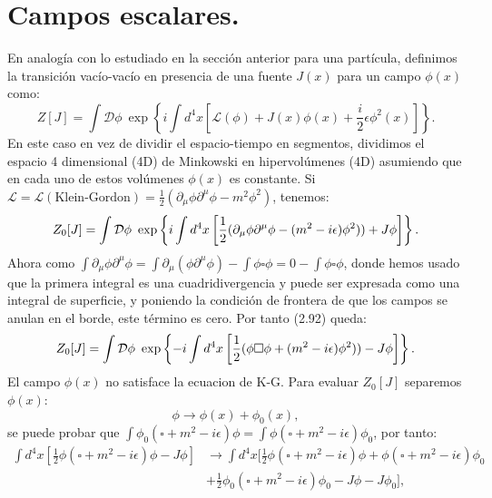 \section{Campos escalares.}
En analogía con lo estudiado en la sección anterior para una partícula, definimos la transición vacío-vacío en presencia de una fuente $J(x)$ para un campo $\phi(x)$ como:
\begin{equation}
Z[J]=\int\mathcal{D}\phi\ \exp\left\{ i\int d^{4}x\left[\mathcal{L}(\phi)+J(x)\phi(x)+\frac{i}{2}\epsilon\phi^{2}(x)\right]\right\} .
\end{equation}
En este caso en vez de dividir el espacio-tiempo en segmentos, dividimos el espacio 4 dimensional (4D) de Minkowski en hipervolúmenes (4D) asumiendo que en cada uno de estos volúmenes $\phi(x)$ es constante. Si $\mathcal{L}=\mathcal{L}(\text{Klein-Gordon})=\frac{1}{2}(\partial_\mu\phi\partial^\mu\phi-m^2 \phi^2)$, tenemos:
\begin{equation}
Z_{0}[J]=\text{\ensuremath{\int\mathcal{D}}}\phi\ \exp\left\{ i\int d^{4}x\left[\frac{1}{2}(\partial_{\mu}\phi\partial^{\mu}\phi-(m^{2}-i\epsilon)\phi^{2}))+J\phi\right]\right\} .
\end{equation} 	
Ahora como $\int\partial_{\mu}\phi\partial^{\mu}\phi=\int\partial_{\mu}(\phi\partial^{\mu}\phi)-\int\phi\square\phi=0-\int\phi\square\phi$, donde hemos usado que la primera integral es una cuadridivergencia y puede ser expresada como una integral de superficie, y poniendo la condición de frontera de que los campos se anulan en el borde, este término es cero. Por tanto (2.92) queda:
\begin{equation}
Z_{0}[J]=\text{\ensuremath{\int\mathcal{D}}}\phi\ \exp\left\{ -i\int d^{4}x\left[\frac{1}{2}(\phi\square\phi+(m^{2}-i\epsilon)\phi^{2}))-J\phi\right]\right\} .
\end{equation}
El campo $\phi(x)$ no satisface la ecuacion de K-G. Para evaluar $Z_0[J]$ separemos $\phi(x)$:
\begin{equation}
\phi \rightarrow \phi(x)+\phi_0(x) ,
\end{equation}
se puede probar que $\int\phi_{0}(\square+m^{2}-i\epsilon)\phi=\int\phi(\square+m^{2}-i\epsilon)\phi_{0}$, por tanto:
\begin{eqnarray}
\nonumber \int d^{4}x\left[\frac{1}{2}\phi(\square+m^{2}-i\epsilon)\phi-J\phi\right]&\rightarrow\int d^{4}x[\frac{1}{2}\phi(\square+m^{2}-i\epsilon)\phi+\phi(\square+m^{2}-i\epsilon)\phi_{0}\\
&+\frac{1}{2}\phi_{0}(\square+m^{2}-i\epsilon)\phi_{0}-J\phi-J\phi_{0}],
\end{eqnarray}
